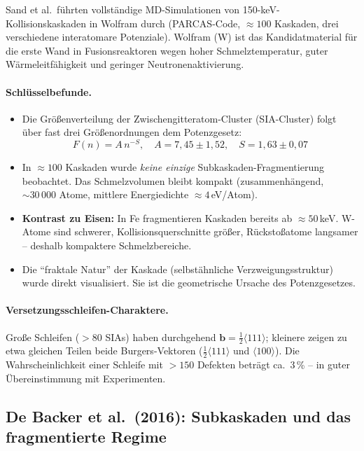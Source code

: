 \documentclass[11pt,a4paper]{article}
\begin{document}
Sand et al.\ führten vollständige MD-Simulationen von 150-keV-Kollisionskaskaden
in Wolfram durch (PARCAS-Code, $\approx 100$ Kaskaden, drei verschiedene
interatomare Potenziale). Wolfram (W) ist das Kandidatmaterial für die
erste Wand in Fusionsreaktoren wegen hoher Schmelztemperatur,
guter Wärmeleitfähigkeit und geringer Neutronenaktivierung.

\paragraph{Schlüsselbefunde.}
\begin{itemize}[itemsep=2pt]
\item Die Größenverteilung der Zwischengitteratom-Cluster (SIA-Cluster)
  folgt über fast drei Größenordnungen dem Potenzgesetz:
  \begin{equation}
  F(n) = A\,n^{-S}, \quad A = 7{,}45 \pm 1{,}52,\quad S = 1{,}63 \pm 0{,}07
  \label{eq:sand}
  \end{equation}
\item In $\approx 100$ Kaskaden wurde \emph{keine einzige} Subkaskaden-Fragmentierung
  beobachtet. Das Schmelzvolumen bleibt kompakt (zusammenhängend, $\sim 30\,000$
  Atome, mittlere Energiedichte $\approx 4$\,eV/Atom).
\item \textbf{Kontrast zu Eisen:} In Fe fragmentieren Kaskaden bereits ab
  $\approx 50$\,keV. W-Atome sind schwerer, Kollisionsquerschnitte größer,
  Rückstoßatome langsamer -- deshalb kompaktere Schmelzbereiche.
\item Die ``fraktale Natur'' der Kaskade (selbstähnliche Verzweigungsstruktur)
  wurde direkt visualisiert. Sie ist die geometrische Ursache des Potenzgesetzes.
\end{itemize}

\paragraph{Versetzungsschleifen-Charaktere.}
Große Schleifen ($> 80$ SIAs) haben durchgehend
$\bm{b} = \frac{1}{2}\langle111\rangle$; kleinere zeigen zu etwa gleichen
Teilen beide Burgers-Vektoren ($\frac{1}{2}\langle111\rangle$ und
$\langle100\rangle$). Die Wahrscheinlichkeit einer Schleife mit $> 150$
Defekten beträgt ca.\ 3\,\% -- in guter Übereinstimmung mit Experimenten.

\subsection{De Backer et al.\ (2016): Subkaskaden und das fragmentierte Regime}
\label{sec:debacker}
\end{document}

